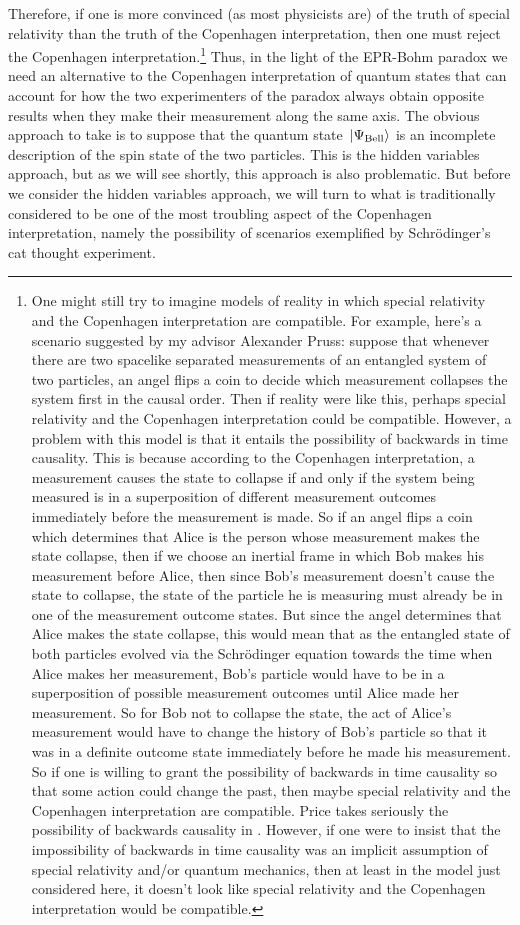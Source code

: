 Therefore, if one is more convinced (as most physicists are) of the truth of special relativity than the truth of the Copenhagen interpretation, then one must reject the Copenhagen interpretation.\footnote{One might still try to imagine models of reality in which special relativity and the Copenhagen interpretation are compatible. For example, here's a scenario suggested by my advisor Alexander Pruss: suppose that whenever there are two spacelike separated measurements of an entangled system of two particles, an angel flips a coin to decide which measurement collapses the system first in the causal order. Then if reality were like this, perhaps special relativity and the Copenhagen interpretation could be compatible. However, a problem with this model is that it entails the possibility of backwards in time causality. This is because according to the Copenhagen interpretation, a measurement causes the state to collapse if and only if the system being measured is in a superposition of different measurement outcomes immediately before the measurement is made. So if an angel flips a coin which determines that Alice is the person whose measurement makes the state collapse, then if we choose an inertial frame in which Bob makes his measurement before Alice, then since Bob's measurement doesn't cause the state to collapse, the state of the particle he is measuring must already be in one of the measurement outcome states. But since the angel determines that Alice makes the state collapse, this would mean that as the entangled state of both particles evolved via the Schr\"{o}dinger equation towards the time when Alice makes her measurement, Bob's particle would have to be in a superposition of possible measurement outcomes until Alice made her measurement. So for Bob not to collapse the state, the act of Alice's measurement would have to change the history of Bob's particle so that it was in a definite outcome state immediately before he made his measurement. So if one is willing to grant the possibility of backwards in time causality so that some action could change the past, then maybe special relativity and the Copenhagen interpretation are compatible. Price takes seriously the possibility of backwards causality in \cite{PriceHuw1994ANRt}. However, if one were to insist that the impossibility of backwards in time causality was an implicit assumption of special relativity and/or quantum mechanics, then at least in the model just considered here, it doesn't look like special relativity and the Copenhagen interpretation would be compatible.} Thus, in the light of the EPR-Bohm paradox we need an alternative to the Copenhagen interpretation of quantum states that can account for how the two experimenters of the paradox always obtain opposite results when they make their measurement along the same axis. The obvious approach to take is to suppose that the quantum state $\ket*{\Psi_{\text{Bell}}}$ is an incomplete description of the spin state of the two particles. This is the hidden variables approach, but as we will see shortly, this approach is also problematic. But before we consider the hidden variables approach, we will turn to what is traditionally considered to be one of the most troubling aspect of the Copenhagen interpretation, namely the possibility of scenarios exemplified by Schr\"{o}dinger's cat thought experiment.
